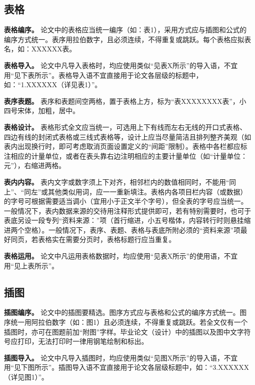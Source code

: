 \documentclass[doublesided]{Style/ucasthesis}%
\begin{document}
\hypertarget{section-26}{%
\subsection{表格}\label{section-26}}

\textbf{表格编序。} 论文中的表格应当统一编序（如：表1），采用方式应与插图和公式的编序方式统一。表序用拉伯数字，且必须连续，不得重复或跳跃。每个表格应拟表名，如：XXXXXX表。

\textbf{表格导入。} 论文中凡导入表格时，均应使用类似``见表X所示''的导入语，不宜用``见下表所示''。表格导入语不宜直接用于论文各层级的标题中，如：``1.XXXXXX（详见表1）''。

\textbf{表序表题。} 表序和表题间空两格，置于表格上方，标为``表XXXXXXXX表''，小四号宋体，加粗，居中。

\textbf{表格设计。} 表格形式全文应当统一，可选用上下有线而左右无线的开口式表格、四边有线的封闭式表格或三线式表格等，设计上应当尽量简洁且排列整齐美观（如表内出现换行时，即可考虑取消页面设置定义的``间距''限制）。表格中各栏都应标注相应的计量单位，或者在表头靠右边注明相应的主要计量单位（如``计量单位：元''），右缩进两格。

\textbf{表内内容。} 表内文字或数字须上下对齐，相邻栏内的数值相同时，不能用``同上''、``同左''或其他类似用词，应一一重新填注。表格内各项目栏内容（或数据）的字号可根据需要适当调小（宜用小于正文半个字号），但全表的字号应当统一。一般情况下，表内数据来源的交待用注释形式提供即可，若有特别需要时，也可于表底另设一段专列``资料来源：''项（首行缩进，小五号楷体，内容转行时则悬挂缩进两个空格）。一般情况下，表序、表题、表格与表底所附必须的``资料来源''项最好同页，若表格实在需要分页时，表格标题行应当重复。

\textbf{表格运用。} 论文中凡运用表格数据时，均应使用``见表X所示''的使用语，不宜用``见上表所示''。

\hypertarget{section-27}{%
\subsection{插图}\label{section-27}}

\textbf{插图编序。} 论文中的插图要精选。图序方式应与表格和公式的编序方式统一。图序统一用阿拉伯数字（如：图1）且必须连续，不得重复或跳跃。若全文仅有一个插图时，亦可在图题前加``附图''字样。毕业论文（设计）中的插图以及图中文字符号应打印，无法打印时一律用钢笔绘制和标出。

\textbf{插图导入。} 论文中凡导入插图时，均应使用类似``见图X所示''的导入语，不宜用``见下图所示''。插图导入语不宜直接用于论文各层级标题中，如：``3.XXXXXX（详见图1）''。
\end{document}
